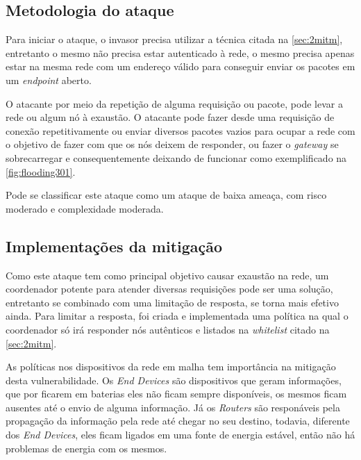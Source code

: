 \subsection{Metodologia do ataque}
\par Para iniciar o ataque, o invasor precisa utilizar a t\'ecnica citada na \autoref{sec:2mitm}, entretanto o mesmo n\~ao precisa estar autenticado \`a rede, o mesmo precisa apenas estar na mesma rede com um endere\c{c}o v\'alido para conseguir enviar os pacotes em um \emph{endpoint} aberto.

\par O atacante por meio da repetição de alguma requisição ou pacote, pode levar a rede ou algum n\'o à exaustão. O atacante pode fazer desde uma requisição de conexão repetitivamente ou enviar diversos pacotes vazios para ocupar a rede com o objetivo de fazer com que os nós deixem de responder, ou fazer o \emph{gateway} se sobrecarregar e consequentemente deixando de funcionar como exemplificado na \autoref{fig:flooding301}.



\par Pode se classificar este ataque como um ataque de baixa amea\c{c}a, com risco moderado e complexidade moderada.

\subsection{Implementações da mitigação}
\par Como este ataque tem como principal objetivo causar exaustão na rede, um coordenador potente para atender diversas requisi\c{c}\~oes pode ser uma solu\c{c}\~ao, entretanto se combinado com uma limita\c{c}\~ao de resposta, se torna mais efetivo ainda. Para limitar a resposta, foi criada e implementada uma pol\'itica na qual o coordenador s\'o ir\'a responder n\'os aut\^enticos e listados na \emph{whitelist} citado na \autoref{sec:2mitm}.

\par As pol\'iticas nos dispositivos da rede em malha tem import\^ancia na mitiga\c{c}\~ao desta vulnerabilidade. Os \emph{End Devices} s\~ao dispositivos que geram informa\c{c}\~oes, que por ficarem em baterias eles n\~ao ficam sempre dispon\'iveis, os mesmos ficam ausentes at\'e o envio de alguma informa\c{c}\~ao. J\'a os \emph{Routers} s\~ao respon\'aveis pela propaga\c{c}\~ao da informa\c{c}\~ao pela rede at\'e chegar no seu destino, todavia, diferente dos \emph{End Devices}, eles ficam ligados em uma fonte de energia est\'avel, então n\~ao h\'a problemas de energia com os mesmos.

